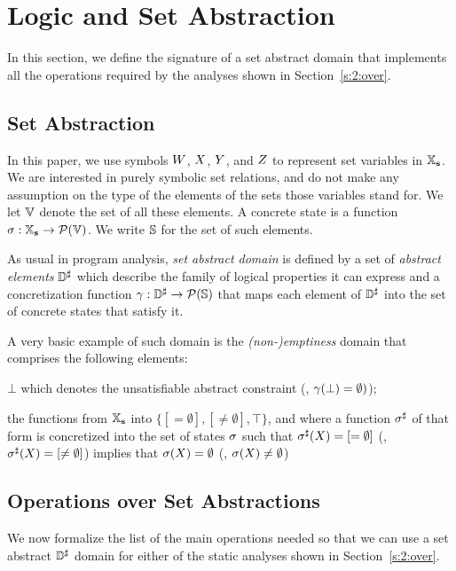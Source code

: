 \section{Logic and Set Abstraction}
\label{sec:logic-and-set-abstraction}
In this section, we define the signature of a set abstract domain that
implements all the operations required by the analyses shown in
Section~\ref{s:2:over}.

\subsection{Set Abstraction}
\label{s:3:1:abs}
In this paper, we use symbols $W$, $X$, $Y$, and $Z$
to represent set variables in $\mathbb{X}_{\bf s}$.
We are interested in purely symbolic set relations, and do not make any
assumption on the type of the elements of the sets those variables stand
for.
We let \( \mathbb{V} \) denote the set of all these elements.
A concrete state is a function \( \sigma: \mathbb{X}_{\bf s} \rightarrow
\mathcal{P}(\mathbb{V}) \).
We write \( \mathbb{S} \) for the set of such elements.

As usual in program analysis, {\em set abstract domain} is defined by a
set of {\em abstract elements} \( {\mathbb{D}}^{\sharp} \) which describe the family of
logical properties it can express and a concretization function
\( \gamma: {\mathbb{D}}^{\sharp} \rightarrow \mathcal{P}(\mathbb{S}) \) that maps each
element of \( {\mathbb{D}}^{\sharp} \) into the set of concrete states that satisfy it.
\begin{example}
  \label{ex:1:mt}
  A very basic example of such domain is the {\em (non-)emptiness} domain
  that comprises the following elements:
  \begin{compactitem}
  \item \( \bot \) which denotes the unsatisfiable abstract constraint
    (\ie, \( \gamma( \bot ) = \emptyset ) \));
  \item the functions from \( \mathbb{X}_{\bf s} \) into \( \{ [=\emptyset],
    [\not=\emptyset], \top \} \), and where a function \( {\sigma}^{\sharp} \) of
    that form is concretized into the set of states \( \sigma \) such that
    \( {\sigma}^{\sharp}( X ) = [=\emptyset] \) (\resp, \( {\sigma}^{\sharp}( X ) =
    [\not=\emptyset] \)) implies that \( \sigma( X ) = \emptyset \)
    (\resp, \( \sigma( X ) \not= \emptyset \))
  \end{compactitem}
\end{example}

\subsection{Operations over Set Abstractions}
\label{s:3:2:sign}
We now formalize the list of the main operations needed so that we can use
a set abstract \( {\mathbb{D}}^{\sharp} \) domain for either of the static analyses shown
in Section~\ref{s:2:over}.

